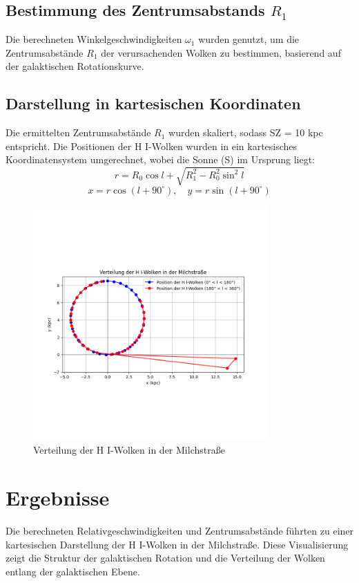 \documentclass[a4paper,12pt]{article}
\begin{document}
\subsection*{Bestimmung des Zentrumsabstands \(R_1\)}
Die berechneten Winkelgeschwindigkeiten \( \omega_1 \) wurden genutzt, um die Zentrumsabstände \( R_1 \) der verursachenden Wolken zu bestimmen, basierend auf der galaktischen Rotationskurve.

\subsection*{Darstellung in kartesischen Koordinaten}
Die ermittelten Zentrumsabstände \( R_1 \) wurden skaliert, sodass SZ = 10 kpc entspricht. Die Positionen der H I-Wolken wurden in ein kartesisches Koordinatensystem umgerechnet, wobei die Sonne (S) im Ursprung liegt:
\[
r = R_0 \cos l + \sqrt{R_1^2 - R_0^2 \sin^2 l}
\]
\[
x = r \cos(l + 90^\circ), \quad y = r \sin(l + 90^\circ)
\]

\begin{figure}[H]
    \centering
    \includegraphics[width=0.8\textwidth]{galatic_h1_distribution.png}
    \caption{Verteilung der H I-Wolken in der Milchstraße}
    \label{fig:galactic_h1_distribution}
\end{figure}

\section*{Ergebnisse}
Die berechneten Relativgeschwindigkeiten und Zentrumsabstände führten zu einer kartesischen Darstellung der H I-Wolken in der Milchstraße. Diese Visualisierung zeigt die Struktur der galaktischen Rotation und die Verteilung der Wolken entlang der galaktischen Ebene.
\end{document}
